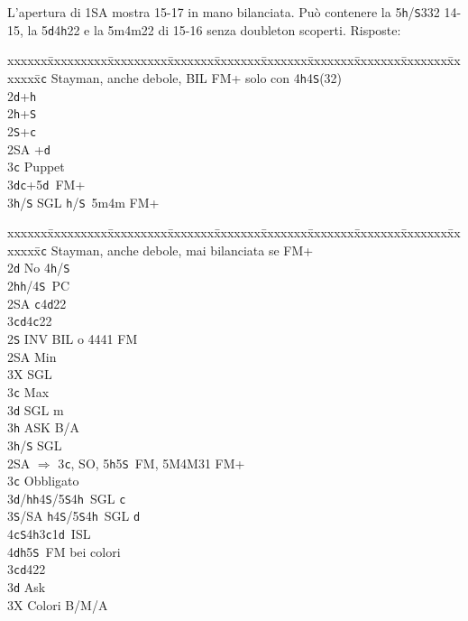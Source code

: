 \documentclass[a4paper,italian]{article}
\newcommand{\BS}{\small{\texttt{S}}}
\newcommand{\BC}{\small{\texttt{c}}}
\newcommand{\BD}{\small{\texttt{d}}}
\newcommand{\BH}{\small{\texttt{h}}}
\newenvironment{bidtable}
{\begin{tabbing}

    xxxxxx\=xxxxxxxxx\=xxxxxxxxx\=xxxxxxx\=xxxxxxx\=xxxxxxx\=xxxxxxx\=xxxxxxx\=xxxxxxx\=xxxxxxx\=\kill}
{\end{tabbing} }%
\begin{document}
\begin{multicols}{2}
    L'apertura di 1\small{SA} mostra 15-17 in mano bilanciata. Può contenere la 5\BH /\BS 332 14-15,
    la 5\BD 4\BH 22 e la 5m4m22 di 15-16 senza doubleton scoperti.
    Risposte:
    \bigbreak
    \begin{bidtable}
        2\BC \> Stayman, anche debole, BIL FM+ solo con 4\BH4\BS(32)\\
        2\BD {}+\BH \\
        2\BH {}+\BS \\
        2\BS {}+\BC \\
        2\small{SA} +\BD \\
        3\BC \> Puppet\\
        3\BD {}\BC +5\BD\ FM+\\
        3\BH/\BS \> SGL \BH/\BS\ 5m4m FM+
    \end{bidtable}
    \bigbreak
    \begin{bidtable}
        2\BC \> Stayman, anche debole, mai bilanciata se FM+\+\\
        2\BD \> No 4\BH /\BS \+\\
        2\BH {}\BH /4\BS\ PC\+\\
        2\small{SA} \BC 4\BD 22\\
        3\BC {}\BD 4\BC 22\-\\
        2\BS \> INV BIL o 4441 FM\+\\
        2\small{SA} \> Min\+\\
        3X \> SGL\-\\
        3\BC \> Max\+\\
        3\BD \> SGL m\+\\
        3\BH \> ASK B/A\-\\
        3\BH/\BS \> SGL\-\-\\
        2\small{SA} \> $\Rightarrow$ 3\BC , SO, 5\BH 5\BS\ FM, 5M4M31 FM+\+\\
        3\BC \> Obbligato\+\\
        3\BD/\BH {}\BH4\BS/5\BS4\BH\ SGL \BC \\
        3\BS/SA \BH4\BS/5\BS4\BH\ SGL \BD \\
        4\BC {}\BS 4\BH 3\BC 1\BD\ ISL\\
        4\BD {}\BH 5\BS\ FM bei colori\-\-\\
        3\BC {}\BD 422\+\\
        3\BD \> Ask\+\\
        3X \> Colori B/M/A\-\-\\

\end{bidtable}
\end{multicols}
\end{document}

